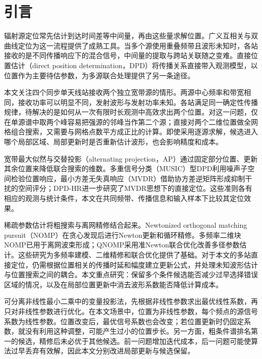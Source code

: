 \section{引言}\label{sec:introduction}
辐射源定位常先估计到达时间差等中间量，再由这些量求解位置。广义互相关与双曲线定位为这一流程提供了成熟工具\cite{KnappCarter1976,ChanHo1994}。当多个源使用重叠频带且波形未知时，各站接收的是不同传播响应下的混合信号，中间量的提取与跨站关联随之变难。直接位置估计（direct position determination，DPD）将传播关系直接带入观测模型，以位置作为主要待估参数，为多源联合处理提供了另一条途径\cite{ChenHudsonYao2002,WeissAmar2005}。

本文关注四个同步单天线站接收两个独立宽带源的情形。两源中心频率和带宽相同，接收功率可以明显不同，发射波形与发射功率未知。各站满足同一确定性传播规律，待解决的是如何从一次有限时长观测中高效求出两个位置。对这一问题，仅在单源谱中取两个峰容易把强源的邻峰当作第二个源；直接对两个二维位置做全网格组合搜索，又需要与网格点数平方成正比的计算。即使采用逐源求解，候选进入哪个局部区域、局部更新时是否重新估计波形，也会影响精度和成本。

宽带最大似然与交替投影（alternating projection，AP）通过固定部分位置、更新其余位置来降低联合搜索的维数\cite{ChenHudsonYao2002}。多重信号分类（MUSIC）型DPD利用噪声子空间检验位置响应\cite{WeissAmar2005}，最小方差无失真响应（MVDR）借助协方差逆矩阵形成抑制干扰的空间评分\cite{Capon1969}；DPD-HR进一步研究了MVDR思想下的直接定位\cite{TirerWeiss2016}。这些准则各有相应的观测与统计条件，本文在共同频带、传播信息和输入样本下比较其定位效果。

稀疏参数估计将粗搜索与离网精修结合起来。Newtonized orthogonal matching pursuit（NOMP）在贪心发现后进行Newton更新和循环精修\cite{Mamandipoor2016}。多频率二维块NOMP已用于离网波束形成\cite{Yang2022}；QNOMP采用准Newton联合优化改善多径参数估计\cite{Zeng2025}。这些研究为多频率建模、二维精修和联合优化提供了基础。对于本文的多站直接定位，仍需根据位置相关的传播时延和幅度建立更新公式，并处理未知波形估计与位置搜索之间的耦合。本文重点研究：保留多个条件候选能否减少过早选择错误区域的情况，以及在局部位置更新中消去波形系数能否降低计算成本。

可分离非线性最小二乘中的变量投影法，先根据非线性参数求出最优线性系数，再只对非线性参数进行优化\cite{GolubPereyra1973}。在本文场景中，位置为非线性参数，每个频点的源信号系数为线性参数。位置改变后，最优信号系数也会改变；若位置更新时仍固定系数，就没有利用这种调整，可能产生过小的位置步长。另一方面，粗条件谱排名第一的候选，精修后未必优于其他候选。前一问题增加迭代成本，后一问题可能使算法过早丢弃有效解，因此本文分别改进局部更新与候选保留。

